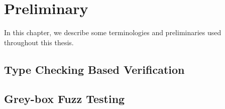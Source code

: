 \chapter{Preliminary} \label{Chapter3}

In this chapter, we describe some terminologies and preliminaries used throughout this thesis.

\section{Type Checking Based Verification}

\section{Grey-box Fuzz Testing}
